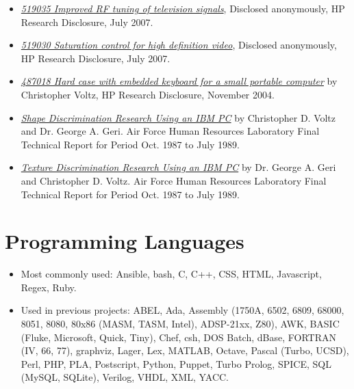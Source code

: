 \documentclass[10pt,letterpaper,oneside]{report}
\begin{document}
\begin{itemize}
  \item \href{http://voltz.ws/resume/RD519035.pdf}{\textit{519035 Improved RF tuning of television signals}}, Disclosed anonymously, HP Research Disclosure, July 2007.

  \item \href{http://voltz.ws/resume/RD519030.pdf}{\textit{519030 Saturation control for high definition video}}, Disclosed anonymously, HP Research Disclosure, July 2007.

  \item \href{http://voltz.ws/resume/RD487018.pdf}{\textit{487018 Hard case with embedded keyboard for a small portable computer}} by Christopher Voltz, HP Research Disclosure, November 2004.

  \item \href{http://www.dtic.mil/docs/citations/ADA219993}{\textit{Shape Discrimination Research Using an IBM PC}} by Christopher D. Voltz and Dr. George A. Geri. Air Force Human Resources Laboratory Final Technical Report for Period Oct. 1987 to July 1989.

  \item \href{http://www.dtic.mil/docs/citations/ADA224347}{\textit{Texture Discrimination Research Using an IBM PC}} by Dr. George A. Geri and Christopher D. Voltz. Air Force Human Resources Laboratory Final Technical Report for Period Oct. 1987 to July 1989.
\end{itemize}

\section{Programming Languages}

\begin{itemize}
  \item Most commonly used: Ansible, bash, C, C++, CSS, HTML, Javascript, Regex, Ruby.

  \item Used in previous projects: ABEL, Ada, Assembly (1750A, 6502, 6809,
    68000, 8051, 8080, 80x86 (MASM, TASM, Intel), ADSP-21xx, Z80), AWK, BASIC
    (Fluke, Microsoft, Quick, Tiny), Chef, csh, DOS Batch, dBase, FORTRAN (IV,
    66, 77), graphviz, Lager, Lex, MATLAB, Octave, Pascal (Turbo, UCSD), Perl,
    PHP, PLA, Postscript, Python, Puppet, Turbo Prolog, SPICE, SQL (MySQL,
    SQLite), Verilog, VHDL, XML, YACC.
  \end{itemize}
\end{document}
